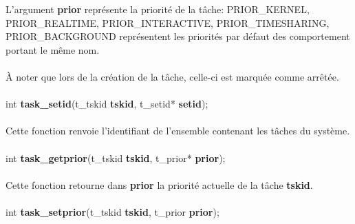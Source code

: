 \documentclass[10pt,a4wide]{article}
\begin{document}
L'argument \textbf{prior} repr\'esente la priorit\'e de la t\^ache:
PRIOR\_KERNEL, PRIOR\_REALTIME, PRIOR\_INTERACTIVE, PRIOR\_TIMESHARING,
PRIOR\_BACKGROUND repr\'esentent les priorit\'es par d\'efaut des
comportement portant le m\^eme nom.

\paragraph{}

\`A noter que lors de la cr\'eation de la t\^ache, celle-ci est marqu\'ee
comme arr\^et\'ee.

\paragraph{}

\hspace{1.5cm}int \textbf{task\_setid}(t\_tskid \textbf{tskid},
                                       t\_setid* \textbf{setid});

\paragraph{}

Cette fonction renvoie l'identifiant de l'ensemble contenant les t\^aches
du syst\`eme.

\paragraph{}

\hspace{1.5cm}int \textbf{task\_getprior}(t\_tskid \textbf{tskid},
                                          t\_prior* \textbf{prior});

\paragraph{}

Cette fonction retourne dans \textbf{prior} la priorit\'e actuelle
de la t\^ache \textbf{tskid}.

\paragraph{}

\hspace{1.5cm}int \textbf{task\_setprior}(t\_tskid \textbf{tskid},
                                          t\_prior \textbf{prior});
\end{document}
